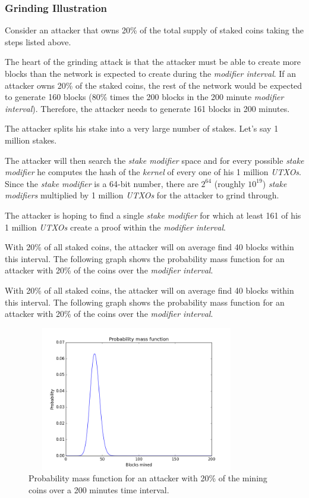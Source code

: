 \documentclass[a4paper,11pt]{article}
\begin{document}
\subsubsection*{Grinding Illustration}

Consider an attacker that owns 20\% of the total supply of staked coins taking the steps listed above.

The heart of the grinding attack is that the attacker must be able to create more blocks than the network is expected to create during the \textit{modifier interval}. If an attacker owns 20\% of the staked coins, the rest of the network would be expected to generate 160 blocks (80\% times the 200 blocks in the 200 minute \textit{modifier interval}). Therefore, the attacker needs to generate 161 blocks in 200 minutes.

The attacker splits his stake into a very large number of stakes. Let's say 1 million stakes.

The attacker will then search the \textit{stake modifier} space and for every possible \textit{stake modifier} he computes the hash of the \textit{kernel} of every one of his 1 million \textit{UTXOs}. Since the \textit{stake modifier} is a 64-bit number, there are $2^{64}$ (roughly $10^{19}$) \textit{stake modifiers} multiplied by 1 million \textit{UTXOs} for the attacker to grind through.

The attacker is hoping to find a single \textit{stake modifier} for which at least 161 of his 1 million \textit{UTXOs} create a proof within the \textit{modifier interval}.

With 20\% of all staked coins, the attacker will on average find 40 blocks within this interval. The following graph shows the probability mass function for an attacker with 20\% of the coins over the \textit{modifier interval}.

With 20\% of all staked coins, the attacker will on average find 40 blocks within this interval. The following graph shows the probability mass function for an attacker with 20\% of the coins over the \textit{modifier interval}.


\begin{figure}[H]
\centering
\includegraphics[width=96mm,height=63mm]{06_gaussian_20perc.png}
\caption{Probability mass function for an attacker with 20\% of the mining coins over a 200 minutes time interval.}
\end{figure}
\end{document}
